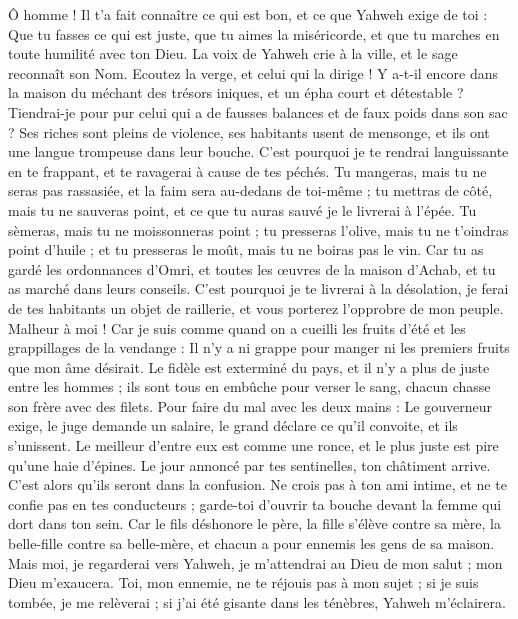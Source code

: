 \begin{multicols}{2}
Ô homme ! Il t'a fait connaître ce qui est bon, et ce que Yahweh exige de toi : Que tu fasses ce qui est juste, que tu aimes la miséricorde, et que tu marches en toute humilité avec ton Dieu.
La voix de Yahweh crie à la ville, et le sage reconnaît son Nom. Ecoutez la verge, et celui qui la dirige !
Y a-t-il encore dans la maison du méchant des trésors iniques, et un épha court et détestable ?
Tiendrai-je pour pur celui qui a de fausses balances et de faux poids dans son sac ?
Ses riches sont pleins de violence, ses habitants usent de mensonge, et ils ont une langue trompeuse dans leur bouche.
C'est pourquoi je te rendrai languissante en te frappant, et te ravagerai à cause de tes péchés.
Tu mangeras, mais tu ne seras pas rassasiée, et la faim sera au-dedans de toi-même ; tu mettras de côté, mais tu ne sauveras point, et ce que tu auras sauvé je le livrerai à l'épée.
Tu sèmeras, mais tu ne moissonneras point ; tu presseras l'olive, mais tu ne t'oindras point d'huile ; et tu presseras le moût, mais tu ne boiras pas le vin.
Car tu as gardé les ordonnances d'Omri, et toutes les œuvres de la maison d'Achab, et tu as marché dans leurs conseils. C'est pourquoi je te livrerai à la désolation, je ferai de tes habitants un objet de raillerie, et vous porterez l'opprobre de mon peuple.
\VerseOne{}Malheur à moi ! Car je suis comme quand on a cueilli les fruits d'été et les grappillages de la vendange : Il n'y a ni grappe pour manger ni les premiers fruits que mon âme désirait.
Le fidèle est exterminé du pays, et il n'y a plus de juste entre les hommes ; ils sont tous en embûche pour verser le sang, chacun chasse son frère avec des filets.
Pour faire du mal avec les deux mains : Le gouverneur exige, le juge demande un salaire, le grand déclare ce qu'il convoite, et ils s'unissent.
Le meilleur d'entre eux est comme une ronce, et le plus juste est pire qu'une haie d'épines. Le jour annoncé par tes sentinelles, ton châtiment arrive. C'est alors qu'ils seront dans la confusion.
Ne crois pas à ton ami intime, et ne te confie pas en tes conducteurs ; garde-toi d'ouvrir ta bouche devant la femme qui dort dans ton sein.
Car le fils déshonore le père, la fille s'élève contre sa mère, la belle-fille contre sa belle-mère, et chacun a pour ennemis les gens de sa maison.
Mais moi, je regarderai vers Yahweh, je m'attendrai au Dieu de mon salut ; mon Dieu m'exaucera.
Toi, mon ennemie, ne te réjouis pas à mon sujet ; si je suis tombée, je me relèverai ; si j'ai été gisante dans les ténèbres, Yahweh m'éclairera.

\end{multicols}
